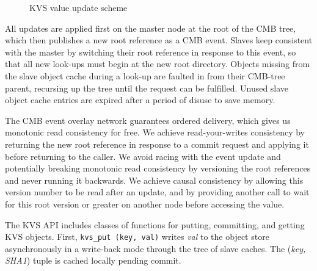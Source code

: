 \begin{figure}[ht]
\vspace{-.5cm}
\centering
\begin{subfigure}[a.b.c = 42.]{
  \label{fig:kvsupdate1}
}%
\end{subfigure}\hfill
\begin{subfigure}[a.b.c = 43 in progress.]{
  \label{fig:kvsupdate2}
}%
\end{subfigure}\hfill
\begin{subfigure}[a.b.c = 43 committed.]{
  \label{fig:kvsupdate3}
}%
\end{subfigure}\hfill
\caption{KVS value update scheme}
\vspace{-.5cm}
\label{fig:kvsupdate}
\end{figure}

All updates are applied first on the master node at the root of the
CMB tree, which then publishes a new root reference as a CMB event.
Slaves keep consistent with the master by switching their root reference
in response to this event, so that all new look-ups must begin at the
new root directory.  Objects missing from the slave object cache during
a look-up are faulted in from their CMB-tree parent, recursing up the tree
until the request can be fulfilled.  Unused slave object cache entries are
expired after a period of disuse to save memory.

The CMB event overlay network guarantees ordered delivery, which gives
us monotonic read consistency for free.  We achieve read-your-writes
consistency by returning the new root reference in response to a commit
request and applying it before returning to the caller.  We avoid
racing with the event update and potentially breaking monotonic read
consistency by versioning the root references and never running it
backwards.  We achieve causal consistency by allowing this version number
to be read after an update, and by providing another call to wait for this
root version or greater on another node before accessing the value.

The KVS API includes classes of functions for putting, committing, and
getting KVS objects.  
First, {\tt kvs\_put (key, val)}
writes {\em val} to the object store asynchronously in a write-back
mode through the tree of slave caches.
The ({\em key, SHA1}) tuple is cached locally pending commit.

